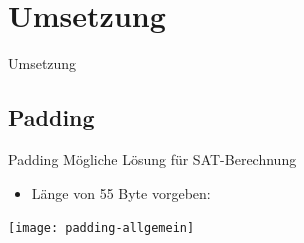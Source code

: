 \documentclass{beamer}
\begin{document}
\section{Umsetzung}
  \begin{frame}{}
    \begin{center}
      \Huge Umsetzung
    \end{center}
  \end{frame}
  \subsection{Padding}
    \begin{frame}{Padding}
      Mögliche Lösung für SAT-Berechnung\\
      \begin{itemize}
       \item Länge von 55 Byte vorgeben:
      \end{itemize}
      \texttt{[image: padding-allgemein]}
    \end{frame}
\end{document}
